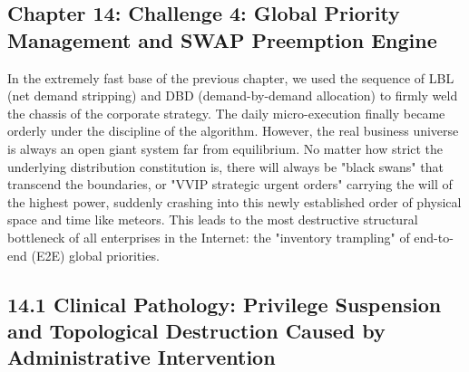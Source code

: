 \documentclass[11pt,a4paper]{article}
\begin{document}
\subsection*{Chapter 14: Challenge 4: Global Priority Management and SWAP Preemption Engine}
In the extremely fast base of the previous chapter, we used the sequence of LBL (net demand stripping) and DBD (demand-by-demand allocation) to firmly weld the chassis of the corporate strategy. The daily micro-execution finally became orderly under the discipline of the algorithm. However, the real business universe is always an open giant system far from equilibrium. No matter how strict the underlying distribution constitution is, there will always be "black swans" that transcend the boundaries, or "VVIP strategic urgent orders" carrying the will of the highest power, suddenly crashing into this newly established order of physical space and time like meteors. This leads to the most destructive structural bottleneck of all enterprises in the Internet: the "inventory trampling" of end-to-end (E2E) global priorities.


\subsection*{14.1 Clinical Pathology: Privilege Suspension and Topological Destruction Caused by Administrative Intervention}
\end{document}
